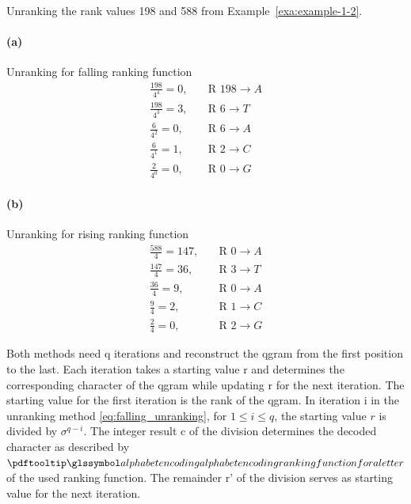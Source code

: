 \begin{bsp}   \label{exa:example-1-3}
    Unranking the rank values 198 and 588 from Example~\ref{exa:example-1-2}.
    \paragraph{(a)} Unranking for falling ranking function
    \begin{align*}
        \frac{198}{4^4} = 0, & \quad  \text{R } 198 \rightarrow A  \\
        \frac{198}{4^3} = 3, & \quad  \text{R } 6 \rightarrow T \\
        \frac{6}{4^2} = 0, & \quad  \text{R } 6 \rightarrow A \\
        \frac{6}{4^1} = 1, & \quad  \text{R } 2 \rightarrow C \\
        \frac{2}{4^0} = 0, & \quad  \text{R } 0 \rightarrow G
    \end{align*}
\paragraph{(b)} Unranking for rising ranking function
\begin{align*}
    \frac{588}{4} = 147, & \quad  \text{R } 0 \rightarrow A  \\
    \frac{147}{4} = 36, & \quad  \text{R } 3 \rightarrow T \\
    \frac{36}{4} = 9, & \quad  \text{R } 0 \rightarrow A \\
    \frac{9}{4} = 2, & \quad  \text{R } 1 \rightarrow C \\
    \frac{2}{4} = 0, & \quad  \text{R } 2 \rightarrow G
\end{align*}
\end{bsp}


Both methods need q iterations and reconstruct the \gls{qgram} from the first position to the last.
Each iteration takes a starting value r and determines the corresponding character of the \gls{qgram} while updating r for the next iteration.
The starting value for the first iteration is the rank of the \gls{qgram}.
In iteration i in the unranking method \eqref{eq:falling_unranking}, for $1 \leq i \leq q$, the starting value $r$
is divided by $\sigma^{q-i}$.
The integer result c of the division determines the decoded character as described by $\rfs$ of the used ranking
function.
The remainder r' of the division serves as starting value for the next iteration.

